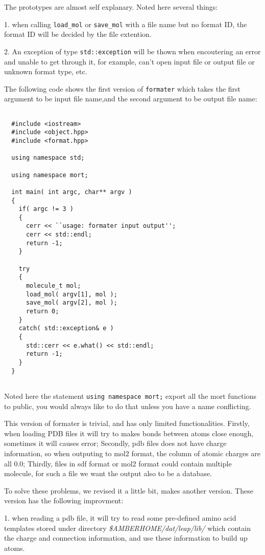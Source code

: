 \documentclass[letterpaper]{book}
\begin{document}
The prototypes are almost self explanary. Noted here several things:


1. when calling \lstinline$load_mol$ or \lstinline$save_mol$ with a file name but no format ID, the 
format ID will be decided by the file extention.


2. An exception of type \lstinline$std::exception$ will be thown when encoutering an error and unable to 
get through it, for example, can't open input file or output file or unknown format type, etc. 


The following code shows the first version of \lstinline$formater$ which takes the first argument to be 
input file name,and the second argument to be output file name:

\begin{lstlisting}

  #include <iostream>
  #include <object.hpp>
  #include <format.hpp>

  using namespace std;

  using namespace mort;

  int main( int argc, char** argv )
  {
    if( argc != 3 )
    {
      cerr << ``usage: formater input output'';
      cerr << std::endl;
      return -1;
    }

    try
    {
      molecule_t mol;
      load_mol( argv[1], mol );
      save_mol( argv[2], mol );
      return 0;
    }
    catch( std::exception& e )
    {
      std::cerr << e.what() << std::endl;
      return -1;
    }
  }


\end{lstlisting}

Noted here the statement \lstinline$using namespace mort;$ export all the mort functions to public, 
you would always like to do that unless you have a name conflicting. 


This version of formater is trivial, and has only limited functionalities. Firstly, when loading PDB files 
it will try to makes bonds between atoms close enough, sometimes it will causes error; Secondly, pdb files 
does not have charge information, so when outputing to mol2 format, the column of atomic 
charges are all 0.0; Thirdly, files in sdf format or mol2 format could contain multiple
molecule, for such a file we want the output also to be a database.

To solve these problems, we revised it a little bit, makes another version. These version 
has the following improvment:


1. when reading a pdb file, it will try to read some pre-defined amino acid templates stored 
under directory {\it \$AMBERHOME/dat/leap/lib/} which contain the charge and connection 
information, and use these information to build up atoms.
\end{document}
